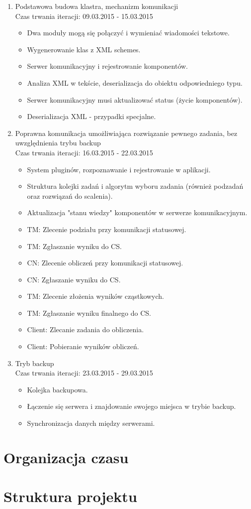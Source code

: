 \documentclass[a4paper]{article}
\begin{document}
	\begin{enumerate}
		\item Podstawowa budowa klastra, mechanizm komunikacji\\
				Czas trwania iteracji: 09.03.2015 - 15.03.2015
		\begin{itemize}
			\item Dwa moduły mogą się połączyć i wymieniać wiadomości tekstowe.
			\item Wygenerowanie klas z XML schemes.
			\item Serwer komunikacyjny i rejestrowanie komponentów.
			\item Analiza XML w tekście, deserializacja do obiektu odpowiedniego typu.
			\item Serwer komunikacyjny musi aktualizować status (życie komponentów).
			\item Deserializacja XML - przypadki specjalne.
		\end{itemize}
		\item Poprawna komunikacja umożliwiająca rozwiązanie pewnego zadania, bez uwzględnienia trybu backup\\
				Czas trwania iteracji: 16.03.2015 - 22.03.2015 
		\begin{itemize}
			\item System pluginów, rozpoznawanie i rejestrowanie w aplikacji.
			\item Struktura kolejki zadań i algorytm wyboru zadania (również podzadań oraz rozwiązań do scalenia).
			\item Aktualizacja "stanu wiedzy" komponentów w serwerze komunikacyjnym.
			\item TM: Zlecenie podziału przy komunikacji statusowej.
			\item TM: Zgłaszanie wyniku do CS.
			\item CN: Zlecenie obliczeń przy komunikacji statusowej.
			\item CN: Zgłaszanie wyniku do CS.
			\item TM: Zlecenie złożenia wyników cząstkowych.
			\item TM: Zgłaszanie wyniku finalnego do CS.
			\item Client: Zlecanie zadania do obliczenia.
			\item Client: Pobieranie wyników obliczeń.
		\end{itemize}
		\item Tryb backup\\
				Czas trwania iteracji: 23.03.2015 - 29.03.2015
		\begin{itemize}
			\item Kolejka backupowa.
			\item Łączenie się serwera i znajdowanie swojego miejsca w trybie backup.
			\item Synchronizacja danych między serwerami.
		\end{itemize}
	\end{enumerate}	 
		
	\section{Organizacja czasu}
	\section{Struktura projektu}
	
\end{document}
